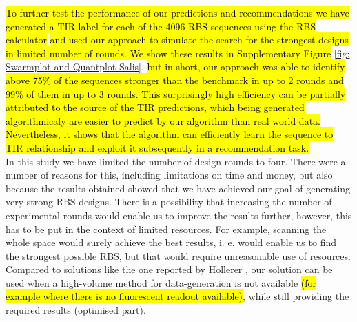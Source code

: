 \documentclass{scrartcl}[2013/05/29]%
\begin{document}
\hl{To further test the performance of our predictions and recommendations we have generated a TIR label for each of the 4096 RBS sequences using the RBS calculator} \cite{Salis2009} \hl{and used our approach to simulate the search for the strongest designs in limited number of rounds.
We show these results in Supplementary Figure} \ref{fig: Swarmplot and Quantplot Salis}, \hl{but in short, our approach was able to  identify above 75\% of the sequences stronger than the benchmark in up to 2 rounds and 99\% of them in up to 3 rounds.
This surprisingly high efficiency can be partially attributed to the source of the TIR predictions, which being generated algorithmicaly are easier to predict by our algorithm than real world data.
Nevertheless, it shows that the algorithm can efficiently learn the sequence to TIR relationship and exploit it subsequently in a recommendation task.}\\

In this study we have limited the number of design rounds to four.
There were a number of reasons for this, including limitations on time and money, but also because the results obtained showed that we have achieved our goal of generating very strong RBS designs.
There is a possibility that increasing the number of experimental rounds would enable us to improve the results further, however, this has to be put in the context of limited resources.
For example, scanning the whole space would surely achieve the best results, i. e. would enable us to find the strongest possible RBS, but that would require unreasonable use of resources.
Compared to solutions like the one reported by Hollerer \cite{Hollerer2020}, our solution can be used when a high-volume method for data-generation is not available \hl{(for example where there is no fluorescent readout available)}, while still providing the required results (optimised part). \\
\end{document}
